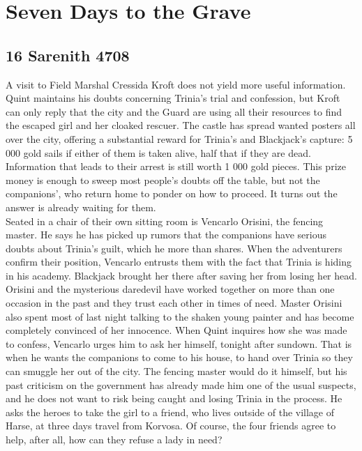 \chapter{Seven Days to the Grave}

\section{16 Sarenith 4708}

A visit to Field Marshal Cressida Kroft does not yield more useful information. Quint maintains his doubts concerning Trinia's trial and confession, but Kroft can only reply that the city and the Guard are using all their resources to find the escaped girl and her cloaked rescuer. The castle has spread wanted posters all over the city, offering a substantial reward for Trinia's and Blackjack's capture: 5 000 gold sails if either of them is taken alive, half that if they are dead. Information that leads to their arrest is still worth 1 000 gold pieces. This prize money is enough to sweep most people's doubts off the table, but not the companions', who return home to ponder on how to proceed. It turns out the answer is already waiting for them.\\

Seated in a chair of their own sitting room is Vencarlo Orisini, the fencing master. He says he has picked up rumors that the companions have serious doubts about Trinia's guilt, which he more than shares. When the adventurers confirm their position, Vencarlo entrusts them with the fact that Trinia is hiding in his academy. Blackjack brought her there after saving her from losing her head. Orisini and the mysterious daredevil have worked together on more than one occasion in the past and they trust each other in times of need. Master Orisini also spent most of last night talking to the shaken young painter and has become completely convinced of her innocence. When Quint inquires how she was made to confess, Vencarlo urges him to ask her himself, tonight after sundown. That is when he wants the companions to come to his house, to hand over Trinia so they can smuggle her out of the city. The fencing master would do it himself, but his past criticism on the government has already made him one of the usual suspects, and he does not want to risk being caught and losing Trinia in the process. He asks the heroes to take the girl to a friend, who lives outside of the village of Harse, at three days travel from Korvosa. Of course, the four friends agree to help, after all, how can they refuse a lady in need?\\

